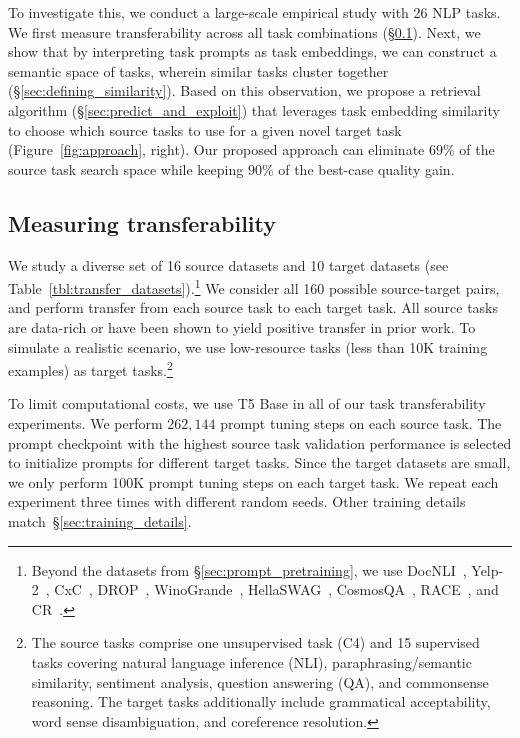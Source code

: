 To investigate this, we conduct a large-scale empirical study with 26 {\small \sc NLP} tasks. We first measure transferability across all task combinations (\S\ref{sec:measuring_transferability}). Next, we show that by interpreting task prompts as task embeddings, we can construct a semantic space of tasks, wherein similar tasks cluster together (\S\ref{sec:defining_similarity}). Based on this observation, we propose a retrieval algorithm (\S\ref{sec:predict_and_exploit}) that leverages task embedding similarity to choose which source tasks to use for a given novel target task (Figure~\ref{fig:approach}, right). Our proposed approach can eliminate $69$\% of the source task search space while keeping $90$\% of the best-case quality gain. 

\subsection{Measuring transferability}
\label{sec:measuring_transferability}

We study a diverse set of 16 source datasets and 10 target datasets (see Table~\ref{tbl:transfer_datasets}).\footnote{Beyond the datasets from \S\ref{sec:prompt_pretraining}, we use {\scriptsize \sc DocNLI}~\cite{WYin21}, {\scriptsize \sc Yelp-2}~\cite{XZhang15}, {\scriptsize \sc CxC}~\cite{ZParekh21}, {\scriptsize \sc DROP}~\cite{DDua19}, {\scriptsize \sc WinoGrande}~\cite{KSakaguchi20}, {\scriptsize \sc HellaSWAG}~\cite{RZellers19}, {\scriptsize \sc CosmosQA}~\cite{LHuang19}, {\scriptsize \sc RACE}~\cite{GLai17}, and {\scriptsize \sc CR}~\cite{MHu04}.} We consider all 160 possible source-target pairs, and perform transfer from each source task to each target task. All source tasks are data-rich or have been shown to yield positive transfer in prior work. To simulate a realistic scenario, we use low-resource tasks (less than 10K training examples) as target tasks.\footnote{The source tasks comprise one unsupervised task ({\scriptsize \sc C4}) and 15 supervised tasks covering natural language inference ({\scriptsize \sc NLI}), paraphrasing/semantic similarity, sentiment analysis, question answering ({\scriptsize \sc QA}), and commonsense reasoning. The target tasks additionally include grammatical acceptability, word sense disambiguation, and coreference resolution.} 

To limit computational costs, we use {\small \sc T5 Base} in all of our task transferability experiments. We perform $262{,}144$ prompt tuning steps on each source task. The prompt checkpoint with the highest source task validation performance is selected to initialize prompts for different target tasks. Since the target datasets are small, we only perform 100K prompt tuning steps on each target task. We repeat each experiment three times with different random seeds. Other training details match~\S\ref{sec:training_details}.

